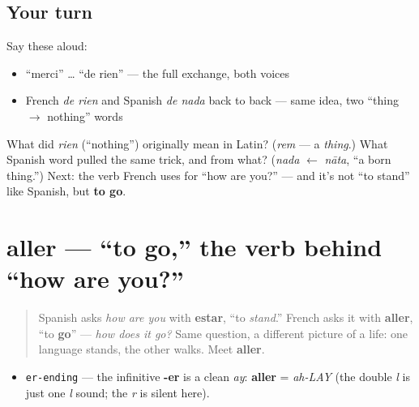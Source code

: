 \subsection*{Your turn}
Say these aloud:

\begin{itemize}
\raggedright
  \item \textquotedblleft{}merci\textquotedblright{} … \textquotedblleft{}de rien\textquotedblright{} — the full exchange, both voices
  \item French \emph{de rien} and Spanish \emph{de nada} back to back — same idea, two \textquotedblleft{}thing $\to$ nothing\textquotedblright{} words
\end{itemize}

\begin{tcolorbox}[breakable,colback=teal!4,colframe=teal!35!black,title={Before you move on}]
What did \emph{rien} (\textquotedblleft{}nothing\textquotedblright{}) originally mean in Latin? (\emph{rem} — a \emph{thing}.) What Spanish word pulled the same trick, and from what? (\emph{nada} $\leftarrow$ \emph{nāta}, \textquotedblleft{}a born thing.\textquotedblright{}) Next: the verb French uses for \textquotedblleft{}how are you?\textquotedblright{} — and it's not \textquotedblleft{}to stand\textquotedblright{} like Spanish, but \textbf{to go}.
\end{tcolorbox}
\section[aller]{aller — \textquotedblleft{}to go,\textquotedblright{} the verb behind \textquotedblleft{}how are you?\textquotedblright{}}

\label{lesson:FR-C03-aller}



\begin{quote}
Spanish asks \emph{how are you} with \textbf{estar}, \textquotedblleft{}to \emph{stand}.\textquotedblright{} French asks it with \textbf{aller}, \textquotedblleft{}to \textbf{go}\textquotedblright{} — \emph{how does it go?} Same question, a different picture of a life: one language stands, the other walks. Meet \textbf{aller}.
\end{quote}

\begin{sounds}
\begin{itemize}
\raggedright
  \item \texttt{er-ending} — the infinitive \textbf{-er} is a clean \emph{ay}: \textbf{aller} = \emph{ah-LAY} (the double \emph{l} is just one \emph{l} sound; the \emph{r} is silent here).
\end{itemize}
\end{sounds}


